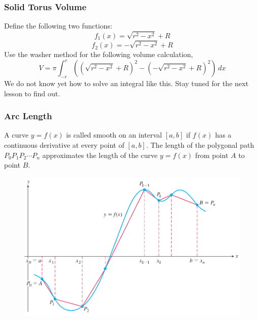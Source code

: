 \documentclass[xcolor=dvipsnames]{beamer}
\begin{document}
\begin{frame}
  \frametitle{Solid Torus Volume}
  Define the following two functions:
  \begin{equation}
    \label{eq:chieyech}
    f_{1}(x)=\sqrt{r^{2}-x^{2}}+R
  \end{equation}
  \begin{equation}
    \label{eq:chieyech}
    f_{2}(x)=-\sqrt{r^{2}-x^{2}}+R
  \end{equation}
  Use the washer method for the following volume calculation,
  \begin{equation}
    \label{eq:xeiliaci}
    V=\pi\int_{-r}^{r}\left(\left(\sqrt{r^{2}-x^{2}}+R\right)^{2}-\left(-\sqrt{r^{2}-x^{2}}+R\right)^{2}\right)\,dx
  \end{equation}
We do not know yet how to solve an integral like this. Stay tuned for
the next lesson to find out.
\end{frame}

\begin{frame}
  \frametitle{Arc Length}
  A curve $y=f(x)$ is called \alert{smooth} on an interval $[a,b]$ if
  $f(x)$ has a continuous derivative at every point of $[a,b]$. The
  length of the polygonal path $P_{0}P_{1}P_{2}\cdots{}P_{n}$
  approximates the length of the curve $y=f(x)$ from point $A$ to
  point $B$.
  \begin{figure}[h]
    \includegraphics[scale=0.25]{./diagrams/pollen.png}
  \end{figure}
  \end{frame}
\end{document}
